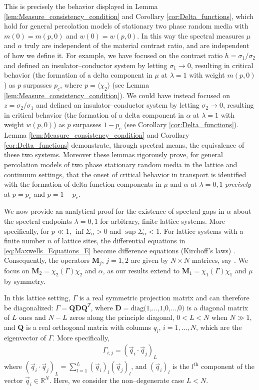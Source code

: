\documentclass[english,12pt,jmp,graphicx]{revtex4-1}
\begin{document}
This is precisely the behavior displayed in  Lemma
\ref{lem:Measure_consistency_condition} and Corollary
\ref{cor:Delta_functions}, which hold for general percolation models of
stationary two phase random media with $m(0)=m(p,0)$ and
$w(0)=w(p,0)$. In this way the spectral measures $\mu$ and $\alpha$ truly are
independent of the material contrast ratio, and are independent of how
we define it. For example, we have focused on the contrast ratio
$h=\sigma_1/\sigma_2$ and defined an insulator--conductor system by letting
$\sigma_1\to0$, resulting in critical behavior (the formation of a delta
component in $\mu$ at $\lambda=1$ with weight $m(p,0)$) as $p$ surpasses
$p_c$, where $p=\langle\chi_2\rangle$ (see Lemma
\ref{lem:Measure_consistency_condition}). We could have instead 
focused on $z=\sigma_2/\sigma_1$ and defined an insulator--conductor system by
letting $\sigma_2\to0$, resulting in critical behavior (the formation of a
delta component in $\alpha$ at $\lambda=1$ with weight $w(p,0)$) as $p$ surpasses
$1-p_c$ (see Corollary \ref{cor:Delta_functions}). Lemma
\ref{lem:Measure_consistency_condition} and Corollary
\ref{cor:Delta_functions} demonstrate, through spectral means, the
equivalence of these two systems. Moreover these lemmas rigorously
prove, for general percolation models of two phase stationary random
media in the lattice and continuum settings, that the onset of
critical behavior in transport is identified with the formation of
delta function components in $\mu$ and $\alpha$ at $\lambda=0,1$ \emph{precisely}
at $p=p_c$ and $p=1-p_c$. 
 
We now provide an analytical proof for the existence of spectral gaps
in $\alpha$ about the spectral endpoints $\lambda=0,1$ for arbitrary, finite
lattice systems. More specifically, for $p\ll1$, $\inf{\Sigma_\alpha}>0$ and
$\sup{\Sigma_\alpha}<1$. For lattice systems with a finite number $n$ of lattice
sites, the differential equations in \eqref{eq:Maxwells_Equations_E}
become difference equations (Kirchoff's laws)
\cite{Golden:JMP-5627}. Consequently, the operators $\mathbf{M}_j$,
$j=1,2$ are given by $N\times N$ matrices, say
\cite{Golden:JoB:337,Golden:JMP-5627}. We focus on
$\mathbf{M}_2=\chi_2(\Gamma)\chi_2$ and $\alpha$, as our results extend to 
$\mathbf{M}_1=\chi_1(\Gamma)\chi_1$ and $\mu$ by symmetry.    

In this lattice setting, $\Gamma$  
is a real symmetric projection matrix and can therefore be diagonalized:
$\Gamma=\mathbf{Q}\mathbf{D}\mathbf{Q}^T$, where 
$\mathbf{D}=\text{diag(1,\ldots,1,0,\ldots,0)}$ is a diagonal matrix of $L$ ones
and $N-L$ zeros along the principle diagonal, $0<L<N$ when $N\gg1$, and
$\mathbf{Q}$ is a real orthogonal matrix with columns $q_i$,
$i=1,\ldots,N$, which are the eigenvector of $\Gamma$. More specifically,
%
\begin{align*}
  \Gamma_{i,j}=(\vec{q}_i\cdot\vec{q}_j)_L
\end{align*}
%
where 
$(\vec{q}_i\cdot\vec{q}_j)_L=\sum_{l=1}^L(\vec{q}_i)_l(\vec{q}_j)_l$, and
$(\vec{q}_i)_l$ is the $l^{\text{th}}$ component of the vector
$\vec{q}_i\in\mathbb{R}^N$. Here, we consider the non--degenerate case
$L<N$.
\end{document}
